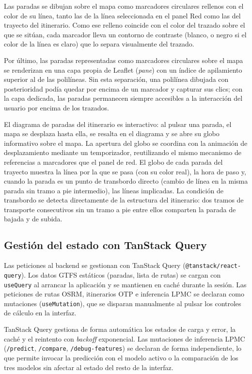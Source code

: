 Las paradas se dibujan sobre el mapa como marcadores circulares rellenos con el color de su línea, tanto las de la línea seleccionada en el panel Red como las del trayecto del itinerario. Como ese relleno coincide con el color del trazado sobre el que se sitúan, cada marcador lleva un contorno de contraste (blanco, o negro si el color de la línea es claro) que lo separa visualmente del trazado.

Por último, las paradas representadas como marcadores circulares sobre el mapa se renderizan en una capa propia de Leaflet (\textit{pane}) con un índice de apilamiento superior al de las polilíneas. Sin esta separación, una polilínea dibujada con posterioridad podía quedar por encima de un marcador y capturar sus clics; con la capa dedicada, las paradas permanecen siempre accesibles a la interacción del usuario por encima de los trazados.

El diagrama de paradas del itinerario es interactivo: al pulsar una parada, el mapa se desplaza hasta ella, se resalta en el diagrama y se abre su globo informativo sobre el mapa. La apertura del globo se coordina con la animación de desplazamiento mediante un temporizador, reutilizando el mismo mecanismo de referencias a marcadores que el panel de red. El globo de cada parada del trayecto muestra la línea por la que se pasa (con su color real), la hora de paso y, cuando la parada es un punto de transbordo directo (cambio de línea en la misma parada sin tramo a pie intermedio), las líneas implicadas. La condición de transbordo se detecta directamente de la estructura del itinerario: dos tramos de transporte consecutivos sin un tramo a pie entre ellos comparten la parada de bajada y de subida.

\subsection{Gestión del estado con TanStack Query}
\label{subsec:impl_frontend_query}

Las peticiones al backend se gestionan con TanStack Query (\texttt{@tanstack/react-query}). Los datos GTFS estáticos (paradas, lista de rutas) se cargan con \texttt{useQuery} al arrancar la aplicación y se mantienen en caché durante la sesión. Las peticiones de rutas OSRM, itinerarios OTP e inferencia LPMC se declaran como mutaciones (\texttt{useMutation}), que se disparan manualmente al pulsar los controles de cálculo en la interfaz.

TanStack Query gestiona de forma automática los estados de carga y error, la caché y el reintento con \textit{backoff} exponencial. Las mutaciones de inferencia LPMC (\texttt{/predict}, \texttt{/compare}, \texttt{/debug-features}) se declaran de forma independiente, lo que permite invocar la predicción con el modelo activo o la comparación de los tres modelos sin afectar al estado del resto de la interfaz.

